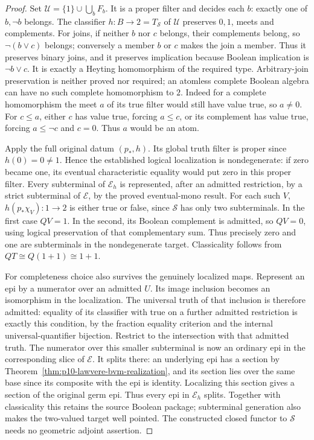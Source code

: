 \begin{proof}
Set \(\mathcal U=\{1\}\cup\bigcup_bF_b\). It is a proper
filter and decides each \(b\): exactly one of \(b,\neg b\)
belongs. The classifier \(h:B\to2=T_{\mathcal S}\) of
\(\mathcal U\) preserves \(0,1\), meets and complements.
For joins, if neither \(b\) nor \(c\) belongs, their complements
belong, so \(\neg(b\vee c)\) belongs; conversely a member
\(b\) or \(c\) makes the join a member. Thus it preserves
binary joins, and it preserves implication because Boolean implication
is \(\neg b\vee c\). It is exactly a Heyting homomorphism of
the required type. Arbitrary-join preservation is neither proved nor
required; an atomless complete Boolean algebra can have no such
complete homomorphism to \(2\). Indeed for a complete homomorphism
the meet \(a\) of its true filter would still have value true,
so \(a\ne0\). For \(c\le a\), either \(c\) has value true,
forcing \(a\le c\), or its complement has value true, forcing
\(a\le\neg c\) and \(c=0\). Thus \(a\) would be an atom.

Apply the full original datum \((p_*,h)\). Its global truth filter
is proper since \(h(0)=0\ne1\). Hence the established logical
localization is nondegenerate: if zero became one, its eventual
characteristic equality would put zero in this proper filter.
Every subterminal of \(\mathcal E_h\) is represented, after an
admitted restriction, by a strict subterminal of \(\mathcal E\),
by the proved eventual-mono result. For each such \(V\),
\(h(p_*\chi_V):1\to2\) is either true or false, since
\(\mathcal S\) has only two subterminals. In the first case
\(QV=1\). In the second, its Boolean complement is admitted,
so \(QV=0\), using logical preservation of that complementary
sum. Thus precisely zero and one are subterminals in the nondegenerate
target. Classicality follows from \(QT\cong Q(1+1)\cong1+1\).

For completeness choice also survives the genuinely localized maps.
Represent an epi by a numerator over an admitted \(U\).
Its image inclusion becomes an isomorphism in the localization.
The universal truth of that inclusion is therefore admitted: equality
of its classifier with true on a further admitted restriction is
exactly this condition, by the fraction equality criterion and the
internal universal-quantifier bijection. Restrict to the intersection
with that admitted truth. The numerator over this smaller subterminal
is now an ordinary epi in the corresponding slice of \(\mathcal E\).
It splits there: an underlying epi has a section by
Theorem~\ref{thm:p10-lawvere-bvm-realization}, and its section lies over the same
base since its composite with the epi is identity. Localizing this
section gives a section of the original germ epi. Thus every epi
in \(\mathcal E_h\) splits. Together with classicality this
retains the source Boolean package; subterminal generation also makes
the two-valued target well pointed. The constructed closed functor
to \(\mathcal S\) needs no geometric adjoint assertion.


\end{proof}
